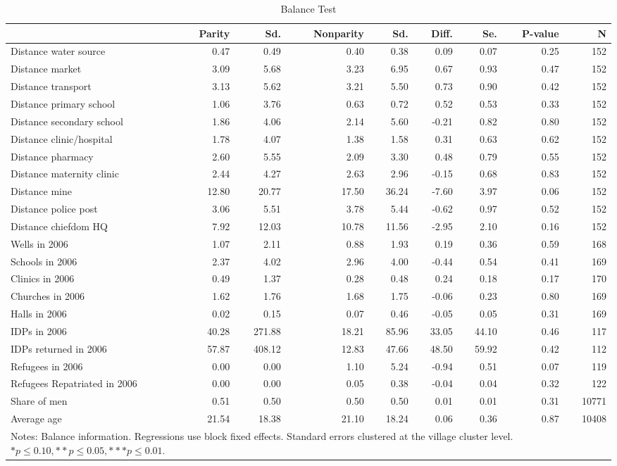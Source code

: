 \begin{table}[h!]
\centering
\caption{Balance Test} 
\label{tab:balance}
\begin{tabular}{lrrrrrrrr}
  & Parity & Sd. & Nonparity & Sd. & Diff. & Se. & P-value & N \\ 
  \hline
\hline
Distance water source & 0.47 & 0.49 & 0.40 & 0.38 & 0.09 & 0.07 & 0.25 & 152 \\ 
  Distance market & 3.09 & 5.68 & 3.23 & 6.95 & 0.67 & 0.93 & 0.47 & 152 \\ 
  Distance transport & 3.13 & 5.62 & 3.21 & 5.50 & 0.73 & 0.90 & 0.42 & 152 \\ 
  Distance primary school & 1.06 & 3.76 & 0.63 & 0.72 & 0.52 & 0.53 & 0.33 & 152 \\ 
  Distance secondary school & 1.86 & 4.06 & 2.14 & 5.60 & -0.21 & 0.82 & 0.80 & 152 \\ 
  Distance clinic/hospital & 1.78 & 4.07 & 1.38 & 1.58 & 0.31 & 0.63 & 0.62 & 152 \\ 
  Distance pharmacy & 2.60 & 5.55 & 2.09 & 3.30 & 0.48 & 0.79 & 0.55 & 152 \\ 
  Distance maternity clinic & 2.44 & 4.27 & 2.63 & 2.96 & -0.15 & 0.68 & 0.83 & 152 \\ 
  Distance mine & 12.80 & 20.77 & 17.50 & 36.24 & -7.60 & 3.97 & 0.06 & 152 \\ 
  Distance police post & 3.06 & 5.51 & 3.78 & 5.44 & -0.62 & 0.97 & 0.52 & 152 \\ 
  Distance chiefdom HQ & 7.92 & 12.03 & 10.78 & 11.56 & -2.95 & 2.10 & 0.16 & 152 \\ 
   \hline
Wells in 2006 & 1.07 & 2.11 & 0.88 & 1.93 & 0.19 & 0.36 & 0.59 & 168 \\ 
  Schools in 2006 & 2.37 & 4.02 & 2.96 & 4.00 & -0.44 & 0.54 & 0.41 & 169 \\ 
  Clinics in 2006 & 0.49 & 1.37 & 0.28 & 0.48 & 0.24 & 0.18 & 0.17 & 170 \\ 
  Churches in 2006 & 1.62 & 1.76 & 1.68 & 1.75 & -0.06 & 0.23 & 0.80 & 169 \\ 
  Halls in 2006 & 0.02 & 0.15 & 0.07 & 0.46 & -0.05 & 0.05 & 0.31 & 169 \\ 
   \hline
IDPs in 2006 & 40.28 & 271.88 & 18.21 & 85.96 & 33.05 & 44.10 & 0.46 & 117 \\ 
  IDPs returned in 2006 & 57.87 & 408.12 & 12.83 & 47.66 & 48.50 & 59.92 & 0.42 & 112 \\ 
  Refugees in 2006 & 0.00 & 0.00 & 1.10 & 5.24 & -0.94 & 0.51 & 0.07 & 119 \\ 
  Refugees Repatriated in 2006 & 0.00 & 0.00 & 0.05 & 0.38 & -0.04 & 0.04 & 0.32 & 122 \\ 
   \hline
Share of men & 0.51 & 0.50 & 0.50 & 0.50 & 0.01 & 0.01 & 0.31 & 10771 \\ 
  Average age & 21.54 & 18.38 & 21.10 & 18.24 & 0.06 & 0.36 & 0.87 & 10408 \\ 
   \hline \hline \multicolumn{9}{p{16cm}}{Notes: Balance information. Regressions use block fixed effects. Standard errors clustered at the village cluster level. $* p \le 0.10, ** p \le 0.05, *** p\le  0.01$.}\end{tabular}
\end{table}

